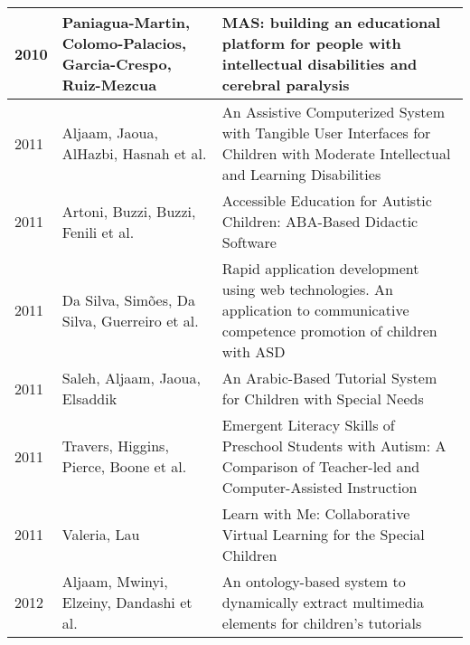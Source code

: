 \documentclass[utf8,english]{gradu3}
\begin{document}
\begin{longtable}{|>{\scriptsize}l|>{\scriptsize}p{3cm}|>{\scriptsize}p{10.4cm}|}
  2010          & Paniagua-Martin, Colomo-Palacios, Garcia-Crespo, Ruiz-Mezcua & MAS: building an educational platform for people with intellectual disabilities and cerebral paralysis                                                                                                                         \\ \hline
  2011          & Aljaam, Jaoua, AlHazbi, Hasnah et al.                        & An Assistive Computerized System with Tangible User Interfaces for Children with Moderate Intellectual and Learning Disabilities                                                                                               \\ \hline
  2011          & Artoni, Buzzi, Buzzi, Fenili et al.                          & Accessible Education for Autistic Children: ABA-Based Didactic Software                                                                                                                                                        \\ \hline
  2011          & Da Silva, Simões, Da Silva, Guerreiro et al.                 & Rapid application development using web technologies. An application to communicative competence promotion of children with ASD                                                                                                \\ \hline
  2011          & Saleh, Aljaam, Jaoua, Elsaddik                               & An Arabic-Based Tutorial System for Children with Special Needs                                                                                                                                                                \\ \hline
  2011          & Travers, Higgins, Pierce, Boone et al.                       & Emergent Literacy Skills of Preschool Students with Autism: A Comparison of Teacher-led and Computer-Assisted Instruction                                                                                                      \\ \hline
  2011          & Valeria, Lau                                                 & Learn with Me: Collaborative Virtual Learning for the Special Children                                                                                                                                                         \\ \hline
  2012          & Aljaam, Mwinyi, Elzeiny, Dandashi et al.                     & An ontology-based system to dynamically extract multimedia elements for children's tutorials                                                                                                                                   \\ \hline

\end{longtable}
\end{document}
